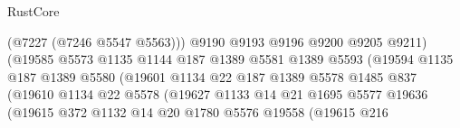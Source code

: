 \begin{lexlean}{RustCore}
\begin{coremodule}
                                            (@7227 (@7246 @5547 @5563)))
                                          @9190
                                          @9193
                                          @9196
                                          @9200
                                          @9205
                                          @9211)
                                        (@19585
                                          @5573
                                          @1135
                                          @1144
                                          @187
                                          @1389
                                          @5581
                                          @1389
                                          @5593
                                          (@19594
                                            @1135
                                            @187
                                            @1389
                                            @5580
                                            (@19601
                                              @1134
                                              @22
                                              @187
                                              @1389
                                              @5578
                                              @1485
                                              @837
                                              (@19610
                                                @1134
                                                @22
                                                @5578
                                                (@19627
                                                  @1133
                                                  @14
                                                  @21
                                                  @1695
                                                  @5577
                                                  @19636
                                                  (@19615
                                                    @372
                                                    @1132
                                                    @14
                                                    @20
                                                    @1780
                                                    @5576
                                                    @19558
                                                    (@19615
                                                      @216

\end{coremodule}
\end{lexlean}
